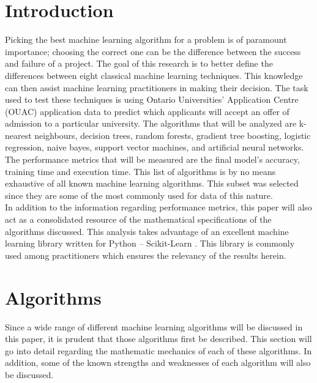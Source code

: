 \documentclass[titlepage]{article}
\begin{document}
\section{Introduction}
Picking the best machine learning algorithm for a problem is of paramount importance; choosing the correct one can be the difference between the success and failure of a project. The goal of this research is to better define the differences between eight classical machine learning techniques. This knowledge can then assist machine learning practitioners in making their decision. The task used to test these techniques is using Ontario Universities' Application Centre (OUAC) application data to predict which applicants will accept an offer of admission to a particular university. The algorithms that will be analyzed are k-nearest neighbours, decision trees, random forests, gradient tree boosting, logistic regression, naive bayes, support vector machines, and artificial neural networks. The performance metrics that will be measured are the final model's accuracy, training time and execution time. This list of algorithms is by no means exhaustive of all known machine learning algorithms. This subset was selected since they are some of the most commonly used for data of this nature.\\
In addition to the information regarding performance metrics, this paper will also act as a consolidated resource of the mathematical specifications of the algorithms discussed. This analysis takes advantage of an excellent machine learning library written for Python -- Scikit-Learn \cite{scikit-learn}. This library is commonly used among practitioners which ensures the relevancy of the results herein.



\newpage
\section{Algorithms}
Since a wide range of different machine learning algorithms will be discussed in this paper, it is prudent that those algorithms first be described. This section will go into detail regarding the mathematic mechanics of each of these algorithms. In addition, some of the known strengths and weaknesses of each algorithm will also be discussed.
\end{document}
